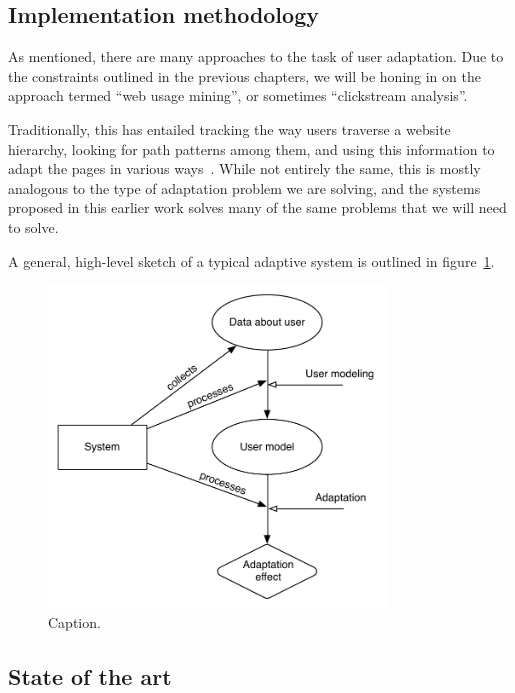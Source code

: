 \subsection{Implementation methodology}

As mentioned, there are many approaches to the task of user adaptation. Due to the constraints outlined in the previous chapters, we will be honing in on the approach termed ``web usage mining'', or sometimes ``clickstream analysis''.

Traditionally, this has entailed tracking the way users traverse a website hierarchy, looking for path patterns among them, and using this information to adapt the pages in various ways~\cite{Mobasher2000,Eirinaki2003,Montgomery2009}. While not entirely the same, this is mostly analogous to the type of adaptation problem we are solving, and the systems proposed in this earlier work solves many of the same problems that we will need to solve.

A general, high-level sketch of a typical adaptive system is outlined in figure~\ref{fig:general_adaptive_system}.

\begin{figure}[h]
  \centering
    \includegraphics[width=0.8\textwidth]{Figures/adaptation-high-level}
  \caption{Caption.}
  \label{fig:general_adaptive_system}
\end{figure}

\subsection{State of the art}





